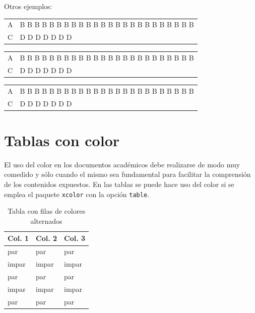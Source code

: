 \documentclass[11pt,a4paper]{article}
\begin{document}
Otros ejemplos:

\begin{center}
\begin{tabular}{lp{2cm}}
\hline
A & B B B B B B B B B B B B B B B B B B B B B B B B\\
C & D D D D D D D\\
\hline
\end{tabular}
\end{center}

\begin{center}  
\begin{tabularx}{.5\textwidth}{lX}
\hline
A & B B B B B B B B B B B B B B B B B B B B B B B B\\
C & D D D D D D D\\
\hline
\end{tabularx}
\end{center}

\begin{center}  
\begin{tabularx}{\textwidth}{lX}
\hline
A & B B B B B B B B B B B B B B B B B B B B B B B B\\
C & D D D D D D D\\
\hline
\end{tabularx}
\end{center}





\section{Tablas con color}
El uso del color en los documentos académicos debe realizarse de modo muy comedido y sólo cuando el mismo sea fundamental para facilitar la comprensión de los contenidos expuestos. En las tablas se puede hace uso del color si se emplea el paquete \texttt{xcolor} con la opción \texttt{table}.

\begin{table}[H]
	\centering
	\caption{Tabla con filas de colores alternados}
	\begin{tabular}{lll}
    \toprule
		Col. 1  & Col. 2  & \cellcolor{red!40}Col. 3 \\
    \midrule
		par    & par    & par   \\
		impar  & impar  & impar \\
		par    & par    & par   \\
		impar  & impar  & impar \\
		par    & par    & par   \\
    \bottomrule
	\end{tabular}
\end{table}
\end{document}
